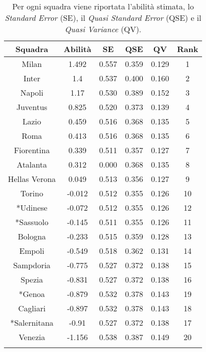 	\begin{table}[!htb]%
	
	\renewcommand{\arraystretch}{1.7}
	\centering
	\begin{tabular}{c c c c c c}
		\hline	
		
		\textbf{Squadra} & \textbf{Abilità} & \textbf{SE} & \textbf{QSE} & \textbf{QV} & \textbf{Rank}   \\	
		\hline			
		Milan & 1.492 & 0.557 & 0.359 & 0.129 & 1\\
		Inter & 1.4 & 0.537 & 0.400 & 0.160 & 2\\
		Napoli & 1.17 & 0.530 & 0.389 & 0.152 & 3 \\
		Juventus & 0.825 & 0.520& 0.373& 0.139& 4\\
		Lazio & 0.459 & 0.516 & 0.368 & 0.135 & 5\\
		Roma & 0.413 & 0.516& 0.368& 0.135& 6\\
		Fiorentina & 0.339 & 0.511& 0.357& 0.127& 7\\
		Atalanta & 0.312 & 0.000 & 0.368& 0.135& 8 \\
		Hellas Verona & 0.049 & 0.513& 0.356& 0.127& 9\\
		Torino & -0.012 & 0.512 & 0.355& 0.126& 10 \\
		*Udinese & -0.072 & 0.512& 0.355 & 0.126& 12\\
		*Sassuolo & -0.145 & 0.511& 0.355 & 0.126& 11\\
		Bologna & -0.233 & 0.515& 0.359& 0.128& 13\\
		Empoli & -0.549 & 0.518& 0.362& 0.131& 14\\
		Sampdoria & -0.775 & 0.527& 0.372& 0.138& 15\\
		Spezia & -0.831 & 0.527& 0.372& 0.138& 16\\
		*Genoa & -0.879 & 0.532& 0.378& 0.143& 19 \\
		Cagliari & -0.897 & 0.532& 0.378& 0.143& 18\\
		*Salernitana & -0.91 & 0.527& 0.372& 0.138& 17\\
		Venezia & -1.156 & 0.538& 0.387& 0.149& 20\\
		\hline
		& & & & &\\
		
	\end{tabular} \hbox{}
	
	\caption{Per ogni squadra viene riportata l'abilità stimata, lo \emph{Standard 
		Error} (SE), il \emph{Quasi Standard Error} (QSE) e il \emph{Quasi Variance} (QV).} \label{tab:BTH}
\end{table}
